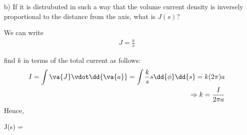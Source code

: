 \documentclass[12pt,a4paper]{article}
\begin{document}
b) If it is distrubuted in such a way that the volume current density is inversely proportional to the distance from the axis, what is $J(s)$?

We can write
\begin{align*}
J = \frac{k}{s}
\end{align*}

find $k$ in terms of the total current as follows:
\begin{align*}
I = \int \va{J} \vdot \dd{\va{a}} = \int \frac{k}{s} s\dd{\phi}\dd{s} = k (2\pi) a \\
\Rightarrow k = \frac{I}{2 \pi a}
\end{align*}
Hence,
\begin{eqbox}
J(s) = 
\end{eqbox}
\end{document}
